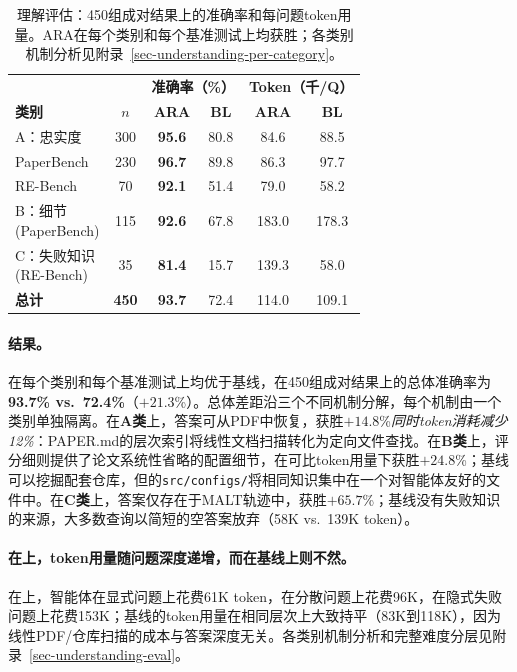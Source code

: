\begin{table}[t]
\centering
\small
\begin{tabular}{lc cc cc}
\toprule
& & \multicolumn{2}{c}{\textbf{准确率（\%）}} & \multicolumn{2}{c}{\textbf{Token（千/Q）}} \\
\cmidrule(lr){3-4} \cmidrule(lr){5-6}
\textbf{类别} & $n$ & \textbf{ARA} & \textbf{BL} & \textbf{ARA} & \textbf{BL} \\
\midrule
A：忠实度                & 300 & \textbf{95.6} & 80.8 & 84.6 & 88.5 \\
\quad PaperBench           & 230 & \textbf{96.7} & 89.8 & 86.3 & 97.7 \\
\quad RE-Bench             &  70 & \textbf{92.1} & 51.4 & 79.0 & 58.2 \\
\addlinespace
\shortstack[l]{B：细节 \\ \scriptsize(PaperBench)} & 115 & \textbf{92.6} & 67.8 & 183.0 & 178.3 \\
\addlinespace
\shortstack[l]{C：失败知识 \\ \scriptsize(RE-Bench)}  &  35 & \textbf{81.4} & 15.7 & 139.3 & 58.0 \\
\midrule
\textbf{总计}           & \textbf{450} & \textbf{93.7} & 72.4 & 114.0 & 109.1 \\
\bottomrule
\end{tabular}
\caption{理解评估：450组成对结果上的准确率和每问题token用量。ARA在每个类别和每个基准测试上均获胜；各类别机制分析见附录~\ref{sec-understanding-per-category}。}
\label{tbl-understanding}
\end{table}

\paragraph{结果。}
\ara{}在每个类别和每个基准测试上均优于基线，在450组成对结果上的总体准确率为\textbf{93.7\% vs.\ 72.4\%}（$+21.3$\%）。总体差距沿三个不同机制分解，每个机制由一个类别单独隔离。在\textbf{A类}上，答案可从PDF中恢复，\ara{}获胜$+14.8$\%\emph{同时token消耗减少12\%}：PAPER.md的层次索引将线性文档扫描转化为定向文件查找。在\textbf{B类}上，评分细则提供了论文系统性省略的配置细节，\ara{}在可比token用量下获胜$+24.8$\%；基线可以挖掘配套仓库，但\ara{}的\texttt{src/configs/}将相同知识集中在一个对智能体友好的文件中。在\textbf{C类}上，答案仅存在于MALT轨迹中，\ara{}获胜$+65.7$\%；基线没有失败知识的来源，大多数查询以简短的空答案放弃（58K vs.\ 139K token）。

\paragraph{在\ara{}上，token用量随问题深度递增，而在基线上则不然。}
在\ara{}上，智能体在显式问题上花费61K token，在分散问题上花费96K，在隐式失败问题上花费153K；基线的token用量在相同层次上大致持平（83K到118K），因为线性PDF/仓库扫描的成本与答案深度无关。各类别机制分析和完整难度分层见附录~\ref{sec-understanding-eval}。

